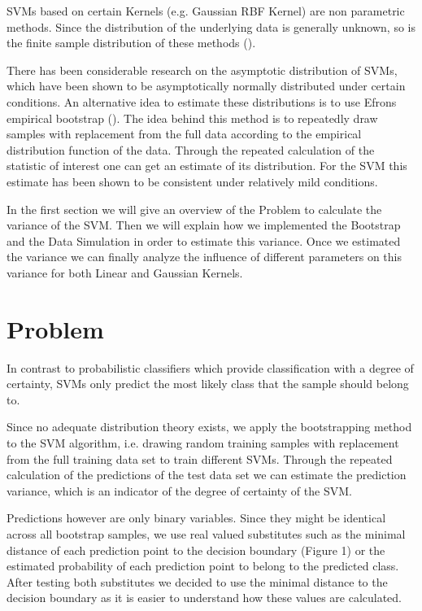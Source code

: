 \documentclass[a4paper]{article}
\begin{document}
SVMs based on certain Kernels (e.g. Gaussian RBF Kernel) are non parametric methods. Since the distribution of the underlying data is generally unknown, so is the finite sample distribution of these methods (\cite{hastie_elements_2005}).

There has been considerable research on the asymptotic distribution of SVMs, which have been shown to be asymptotically normally distributed under certain conditions. An alternative idea to estimate these distributions is to use Efrons empirical bootstrap (\cite{efron_introduction_1994}). The idea behind this method is to repeatedly draw samples with replacement from the full data according to the empirical distribution function of the data. Through the repeated calculation of the statistic of interest one can get an estimate of its distribution. For the SVM this estimate has been shown to be consistent under relatively mild conditions.
    
In the first section we will give an overview of the Problem to calculate the variance of the SVM. Then we will explain how we implemented the Bootstrap and the Data Simulation in order to estimate this variance. Once we estimated the variance we can finally analyze the influence of different parameters on this variance for both Linear and Gaussian Kernels.

\section{Problem}
In contrast to probabilistic classifiers which provide classification with a degree of certainty, SVMs only predict the most likely class that the sample should belong to.  

Since no adequate distribution theory exists, we apply the bootstrapping method to the SVM algorithm, i.e. drawing random training samples with replacement from the full training data set to train different SVMs. Through the repeated calculation of the predictions of the test data set we can estimate the prediction variance, which is an indicator of the degree of certainty of the SVM. 

Predictions however are only binary variables. Since they might be identical across all bootstrap samples, we use real valued substitutes such as the minimal distance of each prediction point to the decision boundary (Figure 1\label{fig1}) or the estimated probability of each prediction point to belong to the predicted class. After testing both substitutes we decided to use the minimal distance to the decision boundary as it is easier to understand how these values are calculated. 
\end{document}
